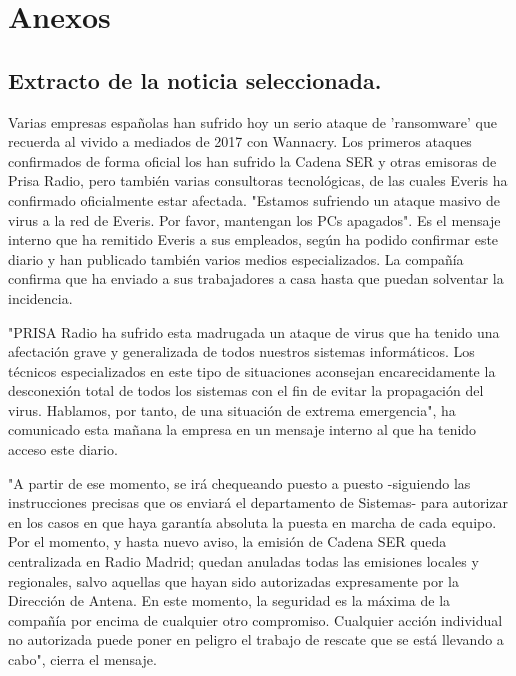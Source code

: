 \documentclass[spanish]{llncs}   %
\begin{document}


\section{Anexos}
\subsection{Extracto de la noticia seleccionada.}\label{noticia}
Varias empresas españolas han sufrido hoy un serio ataque de 'ransomware' que recuerda al 
vivido a mediados de 2017 con Wannacry. Los primeros ataques confirmados de forma oficial 
los han sufrido la Cadena SER y otras emisoras de Prisa Radio, pero también varias consultoras 
tecnológicas, de las cuales Everis ha confirmado oficialmente estar afectada. "Estamos sufriendo 
un ataque masivo de virus a la red de Everis. Por favor, mantengan los PCs apagados". Es el 
mensaje interno que ha remitido Everis a sus empleados, según ha podido confirmar este diario 
y han publicado también varios medios especializados. La compañía confirma que ha enviado a sus 
trabajadores a casa hasta que puedan solventar la incidencia.

"PRISA Radio ha sufrido esta madrugada un ataque de virus que ha tenido una afectación grave y 
generalizada de todos nuestros sistemas informáticos. Los técnicos especializados en este tipo 
de situaciones aconsejan encarecidamente la desconexión total de todos los sistemas con el fin 
de evitar la propagación del virus. Hablamos, por tanto, de una situación de extrema emergencia", 
ha comunicado esta mañana la empresa en un mensaje interno al que ha tenido acceso este diario.

"A partir de ese momento, se irá chequeando puesto a puesto -siguiendo las instrucciones precisas 
que os enviará el departamento de Sistemas- para autorizar en los casos en que haya garantía 
absoluta la puesta en marcha de cada equipo. Por el momento, y hasta nuevo aviso, la emisión de 
Cadena SER queda centralizada en Radio Madrid; quedan anuladas todas las emisiones locales y 
regionales, salvo aquellas que hayan sido autorizadas expresamente por la Dirección de Antena. 
En este momento, la seguridad es la máxima de la compañía por encima de cualquier otro compromiso. 
Cualquier acción individual no autorizada puede poner en peligro el trabajo de rescate que se está 
llevando a cabo", cierra el mensaje.
\end{document}
